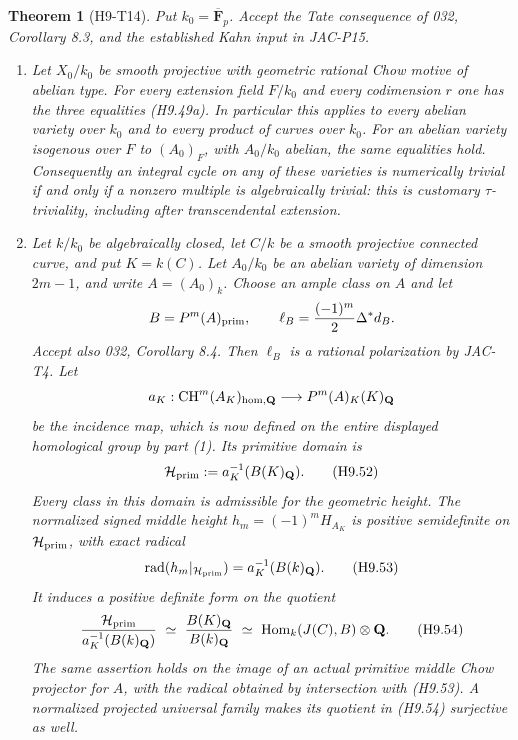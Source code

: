 \documentclass[11pt,a4paper]{article}
\newtheorem{theorem}{Theorem}[section]
\begin{document}
\begin{theorem}[H9-T14]\label{h9:T14}
Put $k_0=\overline{\mathbf F}_p$. Accept the Tate consequence of
032, Corollary 8.3, and the established Kahn input in JAC-P15.

\begin{enumerate}
\item
Let $X_0/k_0$ be smooth projective with geometric rational Chow
motive of abelian type. For every extension field $F/k_0$ and every
codimension $r$ one has the three equalities (H9.49a). In particular
this applies to every
abelian variety over $k_0$ and to every product of curves over $k_0$.
For an abelian variety isogenous over $F$ to $(A_0)_F$, with
$A_0/k_0$ abelian, the same equalities hold. Consequently an integral
cycle on any of these varieties is numerically trivial if and only
if a nonzero multiple is algebraically trivial: this is customary
$\tau$-triviality, including after transcendental extension.

\item
Let $k/k_0$ be algebraically closed, let $C/k$ be a smooth projective
connected curve, and put $K=k(C)$. Let $A_0/k_0$ be an abelian
variety of dimension $2m-1$, and write $A=(A_0)_k$. Choose an ample
class on $A$ and let
\[
 B=P^m(A)_{\rm prim},\qquad
 \ell_B=\frac{(-1)^m}{2}\Delta^*d_B.
\]
Accept also 032, Corollary 8.4. Then $\ell_B$ is a rational
polarization by JAC-T4. Let
\[
 a_K:\operatorname{CH}^m(A_K)_{\rm hom,\mathbf Q}
          \longrightarrow P^m(A)_K(K)_{\mathbf Q}
\]
be the incidence map, which is now defined on the entire displayed
homological group by part (1). Its primitive domain is
\[
 \mathcal H_{\rm prim}
   :=a_K^{-1}(B(K)_{\mathbf Q}).
                                                               \tag{H9.52}
\]
Every class in this domain is admissible for the geometric height.
The normalized signed middle height
$h_m=(-1)^m H_{A_K}$ is positive semidefinite on
$\mathcal H_{\rm prim}$, with exact radical
\[
 \operatorname{rad}(h_m|_{\mathcal H_{\rm prim}})
      =a_K^{-1}(B(k)_{\mathbf Q}).                           \tag{H9.53}
\]
It induces a positive definite form on the quotient
\[
 \frac{\mathcal H_{\rm prim}}
       {a_K^{-1}(B(k)_{\mathbf Q})}
      \ \simeq\
 \frac{B(K)_{\mathbf Q}}{B(k)_{\mathbf Q}}
      \ \simeq\
 \operatorname{Hom}_k(J(C),B)\otimes\mathbf Q.               \tag{H9.54}
\]
The same assertion holds on the image of an actual primitive middle
Chow projector for $A$, with the radical obtained by intersection
with (H9.53). A normalized projected universal family makes its
quotient in (H9.54) surjective as well.
\end{enumerate}
\end{theorem}
\end{document}
